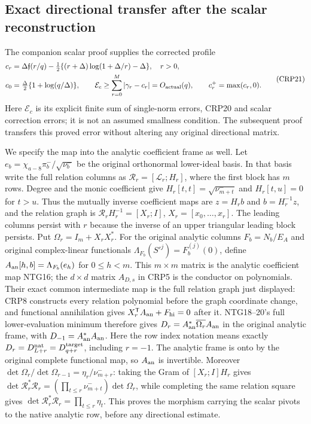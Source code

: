\subsection{Exact directional transfer after the scalar reconstruction}
The companion scalar proof supplies the corrected profile
\[
\begin{split}
c_r&=\Delta\mathfrak f(r/q)
-\tfrac12\{(r+\Delta)\log(1+\Delta/r)-\Delta\},\quad r>0,\\
c_0&=\tfrac\Delta2\{1+\log(q/\Delta)\},\qquad
\mathcal E_c\ge\sum_{r=0}^M|\gamma_r-c_r|
 =O_{\rm actual}(q),\qquad c_r^+=\max(c_r,0).
\end{split}\tag{CRP21}
\]
Here $\mathcal E_c$ is its explicit finite sum of single-norm errors,
CRP20 and scalar correction errors; it is not an assumed smallness
condition. The subsequent proof transfers this proved error without
altering any original directional matrix.

We specify the map into the analytic coefficient frame as well. Let
$e_b=\chi_{a-8}\pi_b^-/\sqrt{\nu_b^-}$ be the original orthonormal
lower-ideal basis. In that basis write the full relation columns as
$\mathcal R_r=[\mathcal L_r;H_r]$, where the first block has $m$ rows.
Degree and the monic coefficient give
$H_r[t,t]=\sqrt{\nu^-_{m+t}}$ and $H_r[t,u]=0$ for $t>u$.
Thus the mutually inverse coefficient maps are $z=H_rb$ and
$b=H_r^{-1}z$, and the relation graph is
$\mathcal R_rH_r^{-1}=[X_r;I]$, $X_r=[x_0,\ldots,x_r]$.
The leading columns persist with $r$ because the inverse of an upper
triangular leading block persists. Put $\Omega_r=I_m+X_rX_r^*$.
For the original analytic columns $F_b=N_b/E_A$ and original
complex-linear functionals $\Lambda_{F_b}(S'^j)=F_b^{(j)}(0)$, define
$A_{\rm an}[h,b]=\Lambda_{F_b}(e_h)$ for $0\le h<m$.
This $m\times m$ matrix is the analytic coefficient map NTG16; the
$d\times d$ matrix $A_{D,s}$ in CRP5 is the conductor on polynomials.
Their exact common intermediate map is the full relation graph just
displayed: CRP8 constructs every relation polynomial before the
graph coordinate change, and functional annihilation gives
$X_r^{\mathsf T}A_{\rm an}+F_{\rm hi}=0$ after it.
NTG18--20's full lower-evaluation minimum therefore gives
$D_r=A_{\rm an}^*\overline{\Omega_r}A_{\rm an}$ in the original
analytic frame, with $D_{-1}=A_{\rm an}^*A_{\rm an}$.
Here the row index notation means exactly
$D_r=D^{\rm nat}_{L+r}=D^{\rm target}_{q+r}$, including $r=-1$.
The analytic frame is onto by the original complete functional map,
so $A_{\rm an}$ is invertible. Moreover
$\det\Omega_r/\det\Omega_{r-1}=\eta_r/\nu^-_{m+r}$: taking the
Gram of $[X_r;I]H_r$ gives
$\det\mathcal R_r^*\mathcal R_r=(\prod_{t\le r}\nu^-_{m+t})\det\Omega_r$,
while completing the same relation square gives
$\det\mathcal R_r^*\mathcal R_r=\prod_{t\le r}\eta_t$.
This proves the morphism carrying the scalar pivots to the native
analytic row, before any directional estimate.

